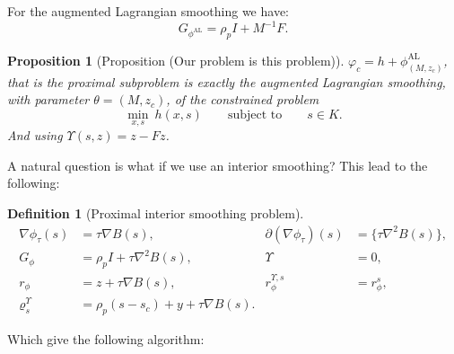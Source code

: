 \documentclass[a4paper,11pt]{book}
\theoremstyle{plain}
\newtheorem{proposition}[theorem]{Proposition}
\theoremstyle{definition}
\newtheorem{definition}[theorem]{Definition}
\theoremstyle{remark}
\numberwithin{equation}{chapter}
\numberwithin{algorithm}{chapter}
\begin{document}
	For the augmented Lagrangian smoothing we have:
	\begin{equation}
		G_{\phi^{\mathrm{AL}}}
		=
		\rho_p I + M^{-1}F.
		\label{eq:G_phi_AL}
	\end{equation}
	
	\begin{proposition}[Proposition (Our problem is this problem)]
		$\varphi_c=h+\phi^{\mathrm{AL}}_{(M,z_c)}$, that is the proximal
		subproblem is exactly the augmented Lagrangian smoothing, with parameter
		$\theta=(M,z_c)$, of the constrained problem
		\begin{equation}
			\min_{x,s}\ h(x,s)\qquad\text{subject to}\qquad s\in K .
		\end{equation}
		And using $\Upsilon(s,z) = z-Fz $.
	\end{proposition}
	
	A natural question is what if we use an interior smoothing? This lead to the following:
	\begin{definition}[Proximal interior smoothing problem]
		\begin{align}
			\nabla\phi_\tau(s) &= \tau\nabla B(s),
			& \partial(\nabla\phi_\tau)(s) &= \{\tau\nabla^{2}B(s)\},\\
			G_\phi &= \rho_pI+\tau\nabla^{2}B(s),
			& \Upsilon &= 0,\\
			r_\phi &= z+\tau\nabla B(s),
			& r^{\Upsilon,s}_\phi &= r^s_\phi,\\
			\varrho^{\Upsilon}_s &= \rho_p(s-s_c)+y+\tau\nabla B(s).
		\end{align}
	\end{definition}
	
	Which give the following algorithm:
	
\end{document}
